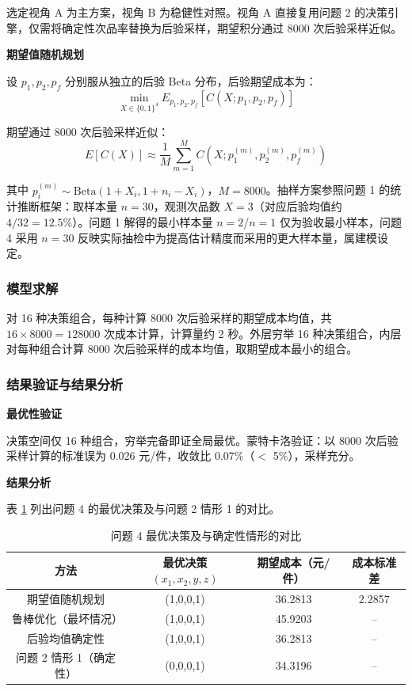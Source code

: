 \documentclass[12pt,a4paper]{ctexart}
\begin{document}
选定视角 A 为主方案，视角 B 为稳健性对照。视角 A 直接复用问题 2 的决策引擎，仅需将确定性次品率替换为后验采样，期望积分通过 8000 次后验采样近似。

\textbf{期望值随机规划}

设 $p_1,p_2,p_f$ 分别服从独立的后验 Beta 分布，后验期望成本为：
\begin{equation}
\min_{X\in\{0,1\}^4} E_{p_1,p_2,p_f}\left[C(X;p_1,p_2,p_f)\right]
\end{equation}

期望通过 8000 次后验采样近似：
\begin{equation}
E[C(X)] \approx \frac{1}{M}\sum_{m=1}^{M} C(X; p_1^{(m)}, p_2^{(m)}, p_f^{(m)})
\end{equation}

其中 $p_i^{(m)} \sim \text{Beta}(1+X_i, 1+n_i-X_i)$，$M=8000$。抽样方案参照问题 1 的统计推断框架：取样本量 $n=30$，观测次品数 $X=3$（对应后验均值约 $4/32=12.5\%$）。问题 1 解得的最小样本量 $n=2$/$n=1$ 仅为验收最小样本，问题 4 采用 $n=30$ 反映实际抽检中为提高估计精度而采用的更大样本量，属建模设定。

\subsubsection{模型求解}

对 16 种决策组合，每种计算 8000 次后验采样的期望成本均值，共 $16\times 8000 = 128000$ 次成本计算，计算量约 2 秒。外层穷举 16 种决策组合，内层对每种组合计算 8000 次后验采样的成本均值，取期望成本最小的组合。

\subsubsection{结果验证与结果分析}

\textbf{最优性验证}

决策空间仅 16 种组合，穷举完备即证全局最优。蒙特卡洛验证：以 8000 次后验采样计算的标准误为 0.026 元/件，收敛比 0.07\%（$<$ 5\%），采样充分。

\textbf{结果分析}

表 \ref{tab:q4_results} 列出问题 4 的最优决策及与问题 2 情形 1 的对比。

\begin{table}[H]
\centering
\caption{问题 4 最优决策及与确定性情形的对比}
\label{tab:q4_results}
\begin{tabular}{cccc}
\toprule
方法 & 最优决策 $(x_1,x_2,y,z)$ & 期望成本（元/件） & 成本标准差 \\
\midrule
期望值随机规划 & (1,0,0,1) & 36.2813 & 2.2857 \\
鲁棒优化（最坏情况） & (1,0,0,1) & 45.9203 & -- \\
后验均值确定性 & (1,0,0,1) & 36.2813 & -- \\
\midrule
问题 2 情形 1（确定性） & (0,0,0,1) & 34.3196 & -- \\
\bottomrule
\end{tabular}
\end{table}
\end{document}

